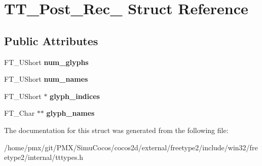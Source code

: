 \hypertarget{structTT__Post__20Rec__}{}\section{T\+T\+\_\+\+Post\+\_\+Rec\+\_\+ Struct Reference}
\label{structTT__Post__20Rec__}
\subsection*{Public Attributes}
\begin{DoxyCompactItemize}
\item 
\mbox{\label{structTT__Post__20Rec___ae3de3677810e6581f2c197e8fa902979}} 
F\+T\+\_\+\+U\+Short {\bfseries num\+\_\+glyphs}
\item 
\mbox{\label{structTT__Post__20Rec___af726ff4997521c76de36f76e1203e2b1}} 
F\+T\+\_\+\+U\+Short {\bfseries num\+\_\+names}
\item 
\mbox{\label{structTT__Post__20Rec___aa856cef36afe51840088f913196e7a4c}} 
F\+T\+\_\+\+U\+Short $\ast$ {\bfseries glyph\+\_\+indices}
\item 
\mbox{\label{structTT__Post__20Rec___ab7d7b27bae8ec92d4c97a80a23719301}} 
F\+T\+\_\+\+Char $\ast$$\ast$ {\bfseries glyph\+\_\+names}
\end{DoxyCompactItemize}


The documentation for this struct was generated from the following file\+:\begin{DoxyCompactItemize}
\item 
/home/pmx/git/\+P\+M\+X/\+Simu\+Cocos/cocos2d/external/freetype2/include/win32/freetype2/internal/tttypes.\+h\end{DoxyCompactItemize}
